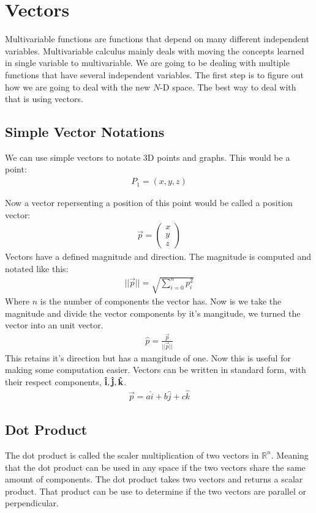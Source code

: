\section{Vectors}
Multivariable functions are functions that depend on many different independent variables. 
Multivariable calculus mainly deals with moving the concepts learned in single variable to multivariable. 
We are going to be dealing with multiple functions that have several independent variables. The first step is to figure out 
how we are going to deal with the new $N$-D space. The best way to deal with that is using vectors. 

\subsection{Simple Vector Notations}
We can use simple vectors to notate 3D points and graphs. This would be a point: 
\begin{align*}
	P_1= (x, y, z)
\end{align*}

Now a vector repersenting a position of this point would be called a position vector: 
\begin{align*}
	\vec{p} = \begin{pmatrix} x \\ y \\ z \end{pmatrix}
\end{align*}
Vectors have a defined magnitude and direction. The magnitude is computed and notated like this: 
\begin{align*}
	|| \vec{p} || = \sqrt{\sum^{n}_{i=0}{p_i^2}}
\end{align*}
Where $n$ is the number of components the vector has. Now is we take the magnitude and divide the vector
components by it's mangitude, we turned the vector into an unit vector. 
\begin{align*}
	\hat{p} = \frac{\vec{p}}{|| \vec{p} ||}
\end{align*}
This retains it's direction but has a mangitude of one. Now this is useful for making some computation easier. 
Vectors can be written in standard form, with their respect components, $\bf{\hat{i}}, \bf{\hat{j}}, \bf{\hat{k}}$.
\begin{align*}
	\vec{p} = a\hat{i} + b\hat{j} + c\hat{k}
\end{align*}

\subsection{Dot Product}
The dot product is called the scaler multiplication of two vectors in $\mathbb{R}^{n}$. Meaning that the dot product can be 
used in any space if the two vectors share the same amount of components. The dot product takes two vectors and returns a scalar product. 
That product can be use to determine if the two vectors are parallel or perpendicular.

